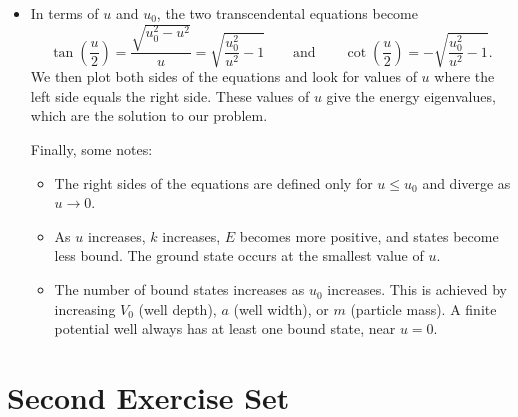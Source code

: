 \documentclass[11pt, a4paper]{article}
\newcommand{\eqtext}[1]{\qquad \text{#1} \qquad}
\begin{document}
\begin{itemize}
	\item In terms of $ u $ and $ u_{0} $, the two transcendental equations become
	\begin{equation*}
		\tan(\frac{u}{2}) = \frac{\sqrt{u_{0}^{2} - u^{2}}}{u} = \sqrt{\frac{u_{0}^{2}}{u^{2}} - 1} \eqtext{and} \cot(\frac{u}{2}) = -\sqrt{\frac{u_{0}^{2}}{u^{2}} - 1}.
	\end{equation*}
	We then plot both sides of the equations and look for values of $ u $ where the left side equals the right side. These values of $ u $ give the energy eigenvalues, which are the solution to our problem.
	
	Finally, some notes:
	\begin{itemize}
		\item The right sides of the equations are defined only for $ u \leq u_{0} $ and diverge as $ u \to 0 $. 
		
		\item As $ u $ increases, $ k $ increases, $ E $ becomes more positive, and states become less bound. The ground state occurs at the smallest value of $ u $. 
		
		
		\item The number of bound states increases as $ u_{0} $ increases. This is achieved by increasing $ V_{0} $ (well depth), $ a $ (well width), or $ m $ (particle mass).  A finite potential well always has at least one bound state, near $ u = 0 $. 
	\end{itemize}
	
	

\end{itemize}



\section{Second Exercise Set}
\end{document}
